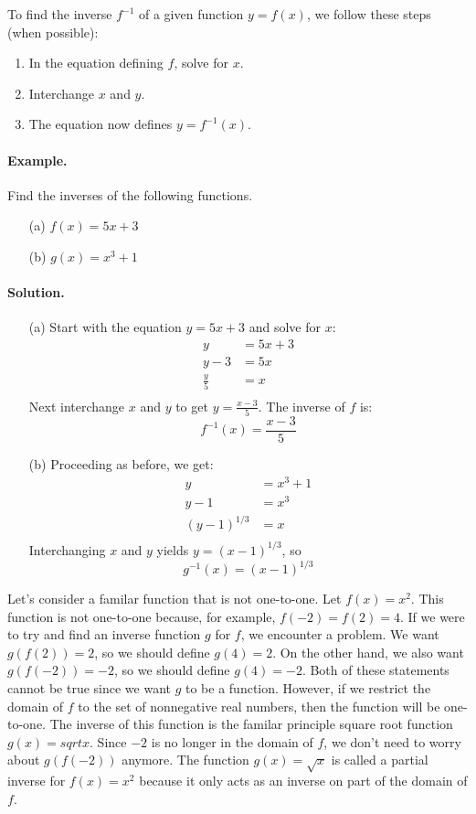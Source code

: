 To find the inverse $f^{-1}$ of a given function $y=f(x)$, we follow these steps (when possible):
\begin{enumerate}
\item In the equation defining $f$, solve for $x$.
\item Interchange $x$ and $y$.
\item The equation now defines $y=f^{-1}(x)$.
\end{enumerate}

\paragraph{Example.} Find the inverses of the following functions.
\begin{itemize}
\item [(a)] $f(x)=5x+3$
\item [(b)] $g(x)=x^3+1$
\end{itemize}

\paragraph{Solution.} 
\begin{itemize}
\item [(a)] Start with the equation $y=5x+3$ and solve for $x$:
\begin{equation*}
\begin{split}
y&=5x+3\\
y-3&=5x\\
\frac{y}5 &=x\\
\end{split}
\end{equation*}
Next interchange $x$ and $y$ to get $\displaystyle y=\frac{x-3}5$. The inverse of $f$ is: \[ f^{-1}(x)=\frac{x-3}5 \]
\item [(b)] Proceeding as before, we get:
\begin{equation*}
\begin{split}
y&=x^3+1\\
y-1&=x^3\\
(y-1)^{1/3}&=x\\
\end{split}
\end{equation*}
Interchanging $x$ and $y$ yields $y=(x-1)^{1/3}$, so \[g^{-1}(x)=(x-1)^{1/3}\]
\end{itemize}

Let's consider a familar function that is not one-to-one. Let $f(x)=x^2$. This function is not one-to-one because, for example, $f(-2)=f(2)=4$. If we were to try and find an inverse function $g$ for $f$, we encounter a problem. We want $g(f(2))=2$, so we should define $g(4)=2$. On the other hand, we also want $g(f(-2))=-2$, so we should define $g(4)=-2$. Both of these statements cannot be true since we want $g$ to be a function. However, if we restrict the domain of $f$ to the set of nonnegative real numbers, then the function will be one-to-one. The inverse of this function is the familar principle square root function $g(x)=sqrt x$. Since $-2$ is no longer in the domain of $f$, we don't need to worry about $g(f(-2))$ anymore. The function $g(x)=\sqrt x$ is called a partial inverse for $f(x)=x^2$ because it only acts as an inverse on part of the domain of $f$.

